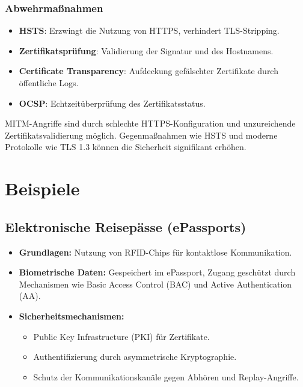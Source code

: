 \documentclass{article}
\begin{document}
\subsubsection{Abwehrmaßnahmen}
\begin{itemize}
\item \textbf{HSTS}: Erzwingt die Nutzung von HTTPS, verhindert TLS-Stripping.
\item \textbf{Zertifikatsprüfung}: Validierung der Signatur und des Hostnamens.
\item \textbf{Certificate Transparency}: Aufdeckung gefälschter Zertifikate durch öffentliche Logs.
\item \textbf{OCSP}: Echtzeitüberprüfung des Zertifikatsstatus.
\end{itemize}

MITM-Angriffe sind durch schlechte HTTPS-Konfiguration und unzureichende Zertifikatsvalidierung möglich. Gegenmaßnahmen wie HSTS und moderne Protokolle wie TLS 1.3 können die Sicherheit signifikant erhöhen.


\section{Beispiele}

\subsection{Elektronische Reisepässe (ePassports)}
\begin{itemize}
    \item \textbf{Grundlagen:} Nutzung von RFID-Chips für kontaktlose Kommunikation.
    \item \textbf{Biometrische Daten:} Gespeichert im ePassport, Zugang geschützt durch Mechanismen wie Basic Access Control (BAC) und Active Authentication (AA).
    \item \textbf{Sicherheitsmechanismen:}
    \begin{itemize}
        \item Public Key Infrastructure (PKI) für Zertifikate.
        \item Authentifizierung durch asymmetrische Kryptographie.
        \item Schutz der Kommunikationskanäle gegen Abhören und Replay-Angriffe.
    \end{itemize}
\end{itemize}
\end{document}
